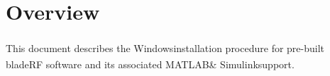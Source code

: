 \def \title{bladeRF Windows\textsuperscript{\textregistered} Install Guide}
\def \subtitle{Installing bladeRF software with MATLAB\textsuperscript{\textregistered} \& Simulink\textsuperscript{\textregistered} support}

\def \emailjszymaniak   {\href{mailto:jon.szymaniak@nuand.com?cc=bladeRF@nuand.com}{\textless{jon.szymaniak@nuand.com}\textgreater}}
\def \afilnuand         {Nuand, LLC}

\def \authors{
  \begin{table}[h]
    \centering
    \begin{tabular}{c}
      Jon Szymaniak \\
      \emailjszymaniak \\
      \afilnuand \\
    \end{tabular}
  \end{table}
}


\def \tablerowcolor{\rowcolor[HTML]{C0C0C0}}
\def \tablecolcolor{\columncolor[HTML]{C0C0C0}}

\def \tm{\textsuperscript{\textregistered\:}}
\def \windows{Windows\tm}
\def \matlab{MATLAB\tm}
\def \simulink{Simulink\tm}

\def \revisions {
  \begin{table}[h]
    \centering
    \begin{tabular}{|c|c|l|}
      \hline
      \tablerowcolor
      \textbf{Revision} & \textbf{Date} & \textbf{Summary} \hspace{4in}  \\ \hline
      1  & 2015-07-01 & Initial revision for 2016.01-rc1 installer \\ \hline
    \end{tabular}
  \end{table}
}





\whitepapercover
\docinfo

\section{Overview}
This document describes the \windows installation procedure for pre-built
bladeRF software and its associated \matlab \& \simulink support.

